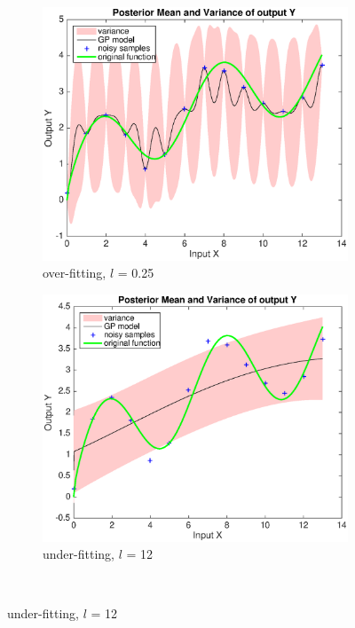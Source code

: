 \documentclass[11pt]{report}
\numberwithin{equation}{chapter}
\begin{document}
\begin{spacing}{2}
\begin{figure}[!htb]

\begin{subfigure}{0.48\textwidth}
\centering
	\includegraphics[scale = 0.4]{overfit.eps}
	\caption{over-fitting, $l$ = 0.25}
\end{subfigure}%
\hspace*{0.05\textwidth}
\begin{subfigure}{0.48\textwidth}
\centering
	\includegraphics[scale = 0.4]{underfit.eps}
	\caption{under-fitting, $l$ = 12}
\end{subfigure}\\


\end{figure}
\end{spacing}
\end{document}
